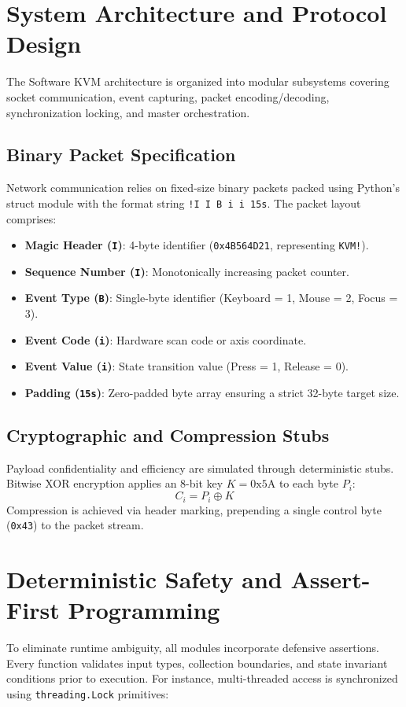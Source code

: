 \documentclass[sigconf,nonacm]{acmart}
\begin{document}
\section{System Architecture and Protocol Design}
The Software KVM architecture is organized into modular subsystems covering socket communication, event capturing, packet encoding/decoding, synchronization locking, and master orchestration.

\subsection{Binary Packet Specification}
Network communication relies on fixed-size binary packets packed using Python's struct module with the format string \texttt{!I I B i i 15s}. The packet layout comprises:
\begin{itemize}
    \item \textbf{Magic Header (\texttt{I})}: 4-byte identifier (\texttt{0x4B564D21}, representing \texttt{KVM!}).
    \item \textbf{Sequence Number (\texttt{I})}: Monotonically increasing packet counter.
    \item \textbf{Event Type (\texttt{B})}: Single-byte identifier (Keyboard = 1, Mouse = 2, Focus = 3).
    \item \textbf{Event Code (\texttt{i})}: Hardware scan code or axis coordinate.
    \item \textbf{Event Value (\texttt{i})}: State transition value (Press = 1, Release = 0).
    \item \textbf{Padding (\texttt{15s})}: Zero-padded byte array ensuring a strict 32-byte target size.
\end{itemize}

\subsection{Cryptographic and Compression Stubs}
Payload confidentiality and efficiency are simulated through deterministic stubs. Bitwise XOR encryption applies an 8-bit key $K = \text{0x5A}$ to each byte $P_i$:
\begin{equation}
    C_i = P_i \oplus K
\end{equation}
Compression is achieved via header marking, prepending a single control byte (\texttt{0x43}) to the packet stream.

\section{Deterministic Safety and Assert-First Programming}
To eliminate runtime ambiguity, all modules incorporate defensive assertions. Every function validates input types, collection boundaries, and state invariant conditions prior to execution. For instance, multi-threaded access is synchronized using \texttt{threading.Lock} primitives:
\end{document}
